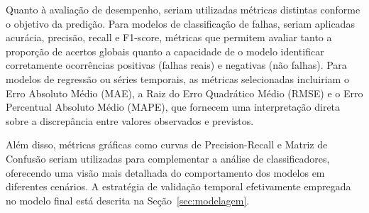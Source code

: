 Quanto à avaliação de desempenho, seriam utilizadas métricas distintas conforme o objetivo da predição. Para modelos de classificação de falhas, seriam aplicadas acurácia, precisão, recall e F1-score, métricas que permitem avaliar tanto a proporção de acertos globais quanto a capacidade de o modelo identificar corretamente ocorrências positivas (falhas reais) e negativas (não falhas). Para modelos de regressão ou séries temporais, as métricas selecionadas incluiriam o Erro Absoluto Médio (MAE), a Raiz do Erro Quadrático Médio (RMSE) e o Erro Percentual Absoluto Médio (MAPE), que fornecem uma interpretação direta sobre a discrepância entre valores observados e previstos.

Além disso, métricas gráficas como curvas de Precision-Recall e Matriz de Confusão seriam utilizadas para complementar a análise de classificadores, oferecendo uma visão mais detalhada do comportamento dos modelos em diferentes cenários. A estratégia de validação temporal efetivamente empregada no modelo final está descrita na Seção~\ref{sec:modelagem}.
